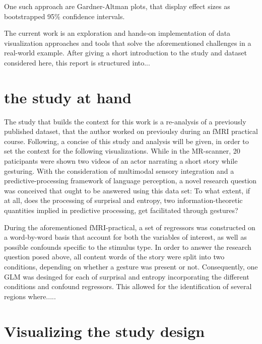 \documentclass[12pt, letterpaper]{article}
\begin{document}
One such approach are Gardner-Altman plots, that display effect sizes as bootstrapped 95\% confidence intervals.  %

The current work is an exploration and hands-on implementation of data visualization approaches and tools that solve the aforementioned challenges in a real-world example. After giving a short introduction to the study and dataset considered here, this report is structured into... %


\section{the study at hand}
The study that builds the context for this work is a re-analysis of a previously published dataset, that the author worked on previoulsy during an fMRI practical course. Following, a concise of this study and analysis will be given, in order to set the context for the following visualizations. While in the MR-scanner, 20 paticipants were shown two videos of an actor narrating a short story while gesturing. With the consideration of multimodal sensory integration and a predictive-processing framework of language perception, a novel research question was conceived that ought to be answered using this data set: To what extent, if at all, does the processing of surprisal and entropy, two information-theoretic quantities implied in predictive processing, get facilitated through gestures?

During the aforementioned fMRI-practical, a set of regressors was constructed on a word-by-word basis that account for both the variables of interest, as well as possible confounds specific to the stimulus type. In order to answer the research question posed above, all content words of the story were split into two conditions, depending on whether a gesture was present or not. Consequently, one GLM was desinged for each of surprisal and entropy incorporating the different conditions and confound regressors. This allowed for the identification of several regions where.....



\section{Visualizing the study design}
\end{document}

